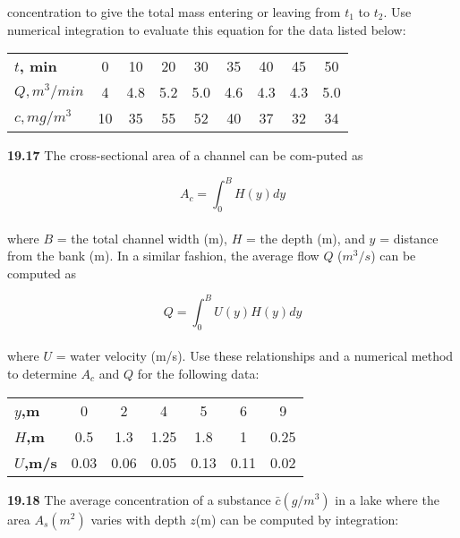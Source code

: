 \documentclass[../main.tex]{subfiles}
\begin{document}
\begin{multicols}{2}
concentration to give the total mass entering or leaving from
$t_1$ to $t_2$. Use numerical integration to evaluate this equation
for the data listed below:\\
\begin{tabular}{lcccccccc}
	\hline
	\scriptsize{\textbf{$t$, min}} & \scriptsize{0} & \scriptsize{10} & \scriptsize{20} & \scriptsize{30} & \scriptsize{35} & \scriptsize{40} & \scriptsize{45} & \scriptsize{50}\\
	\scriptsize{\textbf{$Q, m^3/min$}} & \scriptsize{4} & \scriptsize{4.8} & \scriptsize{5.2} & \scriptsize{5.0} & \scriptsize{4.6} & \scriptsize{4.3} & \scriptsize{4.3} & \scriptsize{5.0}\\
	\scriptsize{\textbf{$c, mg/m^3$}} & \scriptsize{10} & \scriptsize{35} & \scriptsize{55} & \scriptsize{52} & \scriptsize{40} & \scriptsize{37} & \scriptsize{32} & \scriptsize{34}\\ 	\hline

\end{tabular}

\textbf{19.17} The cross-sectional area of a channel can be com-puted as

	$$A_c=\int^{B}_{0}H(y)dy$$\\
where $B$ = the total channel width (m), $H$ = the depth (m),
and $y$ = distance from the bank (m). In a similar fashion, the
average flow $Q$ ($m^3/s$) can be computed as

	$$Q=\int^{B}_{0}U(y)H(y)dy$$\\
where $U$ = water velocity (m/s). Use these relationships and
a numerical method to determine $A_c$ and $Q$ for the following
data:\\
\begin{tabular}{lcccccc}
	\hline
	\scriptsize{\textbf{$y$,m}} & \scriptsize{0} & \scriptsize{2} & \scriptsize{4} & \scriptsize{5} & \scriptsize{6} & \scriptsize{9}\\
	\scriptsize{\textbf{$H$,m}} & \scriptsize{0.5} & \scriptsize{1.3} & \scriptsize{1.25} & \scriptsize{1.8} & \scriptsize{1} & \scriptsize{0.25}\\
	\scriptsize{\textbf{$U$,m/s}} & \scriptsize{0.03} & \scriptsize{0.06} & \scriptsize{0.05} & \scriptsize{0.13} & \scriptsize{0.11} & \scriptsize{0.02}\\ 	\hline
\end{tabular}
\vspace{0.2in}

\textbf{19.18} The average concentration of a substance $\bar{c}(g/m^3
)$ in a lake where the area $A_{s}(m^2)$ varies with depth $z$(m) can be
computed by integration:
	

\end{multicols}
\end{document}
